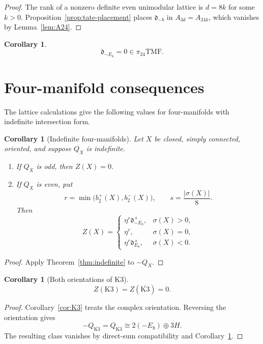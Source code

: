 \documentclass[11pt,a4paper]{amsart}
\newcommand{\TMF}{\mathrm{TMF}}
\newcommand{\dclass}{\mathfrak d}
\theoremstyle{plain}
\newtheorem{corollary}[theorem]{Corollary}
\theoremstyle{definition}
\theoremstyle{remark}
\begin{document}
\begin{proof}
The rank of a nonzero definite even unimodular lattice is $d=8k$
for some $k>0$. Proposition~\ref{prop:tate-placement} places
$\dclass_{-b}$ in $A_{3d}=A_{24k}$, which vanishes by
Lemma~\ref{lem:A24}.
\end{proof}

\begin{corollary}\label{cor:minus-E8}
\[
 \dclass_{-E_8}=0\in\pi_{24}\TMF.
\]
\end{corollary}

\section{Four-manifold consequences}\label{sec:four-manifolds}

The lattice calculations give the following values for
four-manifolds with indefinite intersection form.

\begin{corollary}[Indefinite four-manifolds]\label{cor:indefinite-four}
Let $X$ be closed, simply connected, oriented, and suppose
$Q_X$ is indefinite.
\begin{enumerate}[label=\textup{(\roman*)},leftmargin=2.5em]
\item If $Q_X$ is odd, then $Z(X)=0$.
\item If $Q_X$ is even, put
\[
 r=\min\bigl(b_2^+(X),b_2^-(X)\bigr),
 \qquad
 s=\frac{|\sigma(X)|}{8}.
\]
Then
\[
 Z(X)=
 \begin{cases}
  \eta^r\dclass_{-E_8}^{\,s},&\sigma(X)>0,\\
  \eta^r,&\sigma(X)=0,\\
  \eta^r\dclass_{E_8}^{\,s},&\sigma(X)<0.
 \end{cases}
\]
\end{enumerate}
\end{corollary}

\begin{proof}
Apply Theorem~\ref{thm:indefinite} to $-Q_X$.
\end{proof}

\begin{corollary}[Both orientations of K3]\label{cor:both-K3}
\[
 \boxed{Z(\mathrm{K3})=Z(\overline{\mathrm{K3}})=0.}
\]
\end{corollary}

\begin{proof}
Corollary~\ref{cor:K3} treats the complex orientation.
Reversing the orientation gives
\[
 -Q_{\overline{\mathrm{K3}}}=Q_{\mathrm{K3}}
 \cong2(-E_8)\oplus3H.
\]
The resulting class vanishes by direct-sum compatibility
and Corollary~\ref{cor:minus-E8}.
\end{proof}
\end{document}
